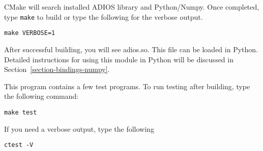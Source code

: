 CMake will search installed ADIOS library and Python/Numpy. Once completed, type \verb+make+ to build or type the following for the verbose output.
\begin{lstlisting}
make VERBOSE=1
\end{lstlisting}

After successful building, you will see adios.so. This file can be
loaded in Python. Detailed instructions for using this module in Python will be discussed in Section~\ref{section-bindings-numpy}.

This program contains a few test programs. To run testing after building,
type the following command:
\begin{lstlisting}
make test
\end{lstlisting}

If you need a verbose output, type the following
\begin{lstlisting}
ctest -V
\end{lstlisting}


